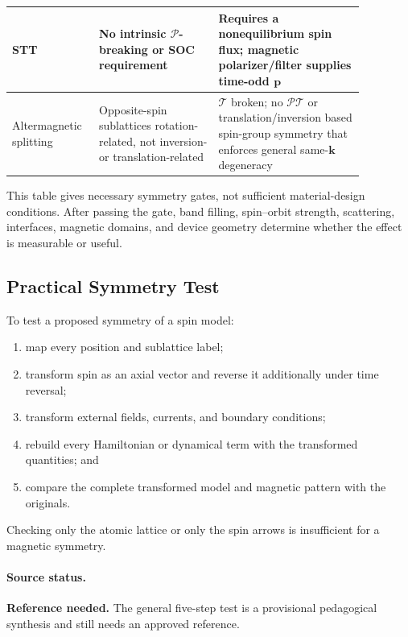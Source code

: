 \begin{center}
\begin{tabular}{|p{0.18\linewidth}|p{0.31\linewidth}|p{0.38\linewidth}|}
        \hline
        STT                     & No intrinsic $\mathcal{P}$-breaking or SOC requirement                                                         &
        Requires a nonequilibrium spin flux; magnetic polarizer/filter supplies time-odd $\mathbf{p}$                                                                                     \\
        \hline
        Altermagnetic splitting & Opposite-spin sublattices rotation-related, not inversion- or translation-related                              &
        $\mathcal{T}$ broken; no $\mathcal{PT}$ or translation/inversion based spin-group symmetry that enforces general same-$\mathbf{k}$ degeneracy                                     \\
        \hline
    \end{tabular}
\end{center}

This table gives necessary symmetry gates, not sufficient material-design
conditions.  After passing the gate, band filling, spin--orbit strength,
scattering, interfaces, magnetic domains, and device geometry determine
whether the effect is measurable or useful.

\subsection{Practical Symmetry Test}

To test a proposed symmetry of a spin model:
\begin{enumerate}
    \item map every position and sublattice label;
    \item transform spin as an axial vector and reverse it additionally under
          time reversal;
    \item transform external fields, currents, and boundary conditions;
    \item rebuild every Hamiltonian or dynamical term with the transformed
          quantities; and
    \item compare the complete transformed model and magnetic pattern with the
          originals.
\end{enumerate}
Checking only the atomic lattice or only the spin arrows is insufficient for a
magnetic symmetry.

\paragraph{Source status.}
\textbf{Reference needed.}  The general five-step test is a provisional
pedagogical synthesis and still needs an approved reference.

